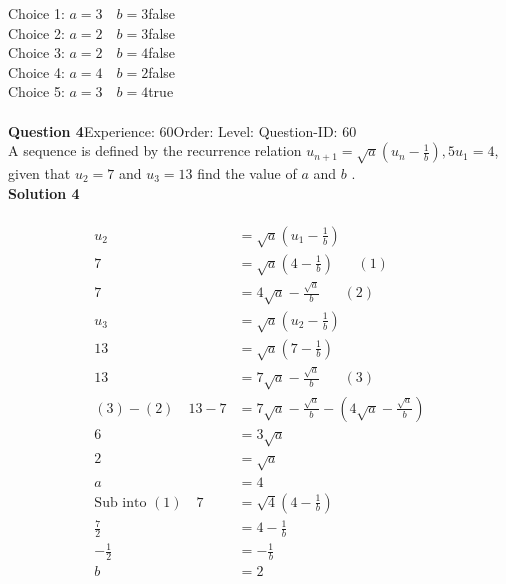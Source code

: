 \documentclass{article}
\begin{document}
Choice 1: \hspace{20pt}$a=3\quad b=3$\hspace{20pt}false\\
Choice 2: \hspace{20pt}$a=2\quad b=3$\hspace{20pt}false\\
Choice 3: \hspace{20pt}$a=2\quad b=4$\hspace{20pt}false\\
Choice 4: \hspace{20pt}$a=4\quad b=2$\hspace{20pt}false\\
Choice 5: \hspace{20pt}$a=3\quad b=4$\hspace{20pt}true\\
\\[4pt]
\noindent\textbf{Question 4}\hspace{20pt}Experience: 60\hspace{20pt}Order: \hspace{20pt}Level: \hspace{20pt}Question-ID: 60\\[2pt]
A sequence is defined by the recurrence relation $u_{n+1}=\sqrt{a}\left(u_n-\displaystyle\frac{1}{b}\right),5 u_1=4$, given that $u_2=7$ and $u_3=13$ find the value of $a$ and $b$ .\\[4pt]
\noindent\textbf{Solution 4}\\[2pt]
\\[-35pt]\begin{align*}
u_2&=\sqrt{a}\left(u_1-\displaystyle\frac{1}{b}\right)\\[2pt]
7&=\sqrt{a}\left(4-\displaystyle\frac{1}{b}\right)\hspace{20pt}(1)\\[2pt]
7&=4\sqrt{a}-\displaystyle\frac{\sqrt{a}}{b}\hspace{20pt}(2)\\[12pt]
u_3&=\sqrt{a}\left(u_2-\displaystyle\frac{1}{b}\right)\\[2pt]
13&=\sqrt{a}\left(7-\displaystyle\frac{1}{b}\right)\\[2pt]
13&=7\sqrt{a}-\displaystyle\frac{\sqrt{a}}{b}\hspace{20pt}(3)\\[12pt]
(3)-(2)\quad13-7&=7\sqrt{a}-\displaystyle\frac{\sqrt{a}}{b}-\left(4\sqrt{a}-\displaystyle\frac{\sqrt{a}}{b}\right)\\[2pt]
6&=3\sqrt{a}\\[2pt]
2&=\sqrt{a}\\[2pt]
a&=4\\[12pt]
\text{Sub into} \,\,(1)\quad 7&=\sqrt{4}\left(4-\displaystyle\frac{1}{b}\right)\\[2pt]
\displaystyle\frac{7}{2}&=4-\displaystyle\frac{1}{b}\\[2pt]
-\displaystyle\frac{1}{2}&=-\displaystyle\frac{1}{b}\\[2pt]
b&=2
\end{align*}
\end{document}

